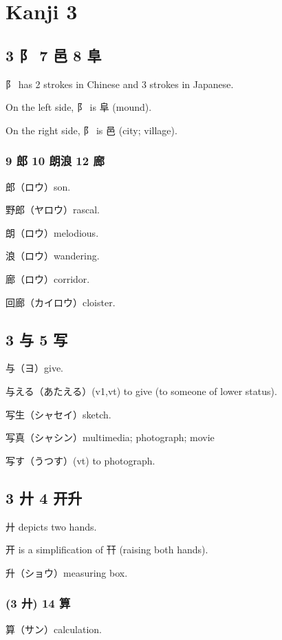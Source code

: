 \chapter{Kanji 3}

\section{3 阝 7 邑 8 阜}

阝 has 2 strokes in Chinese and 3 strokes in Japanese.

On the left side, 阝 is 阜 (mound).

On the right side, 阝 is 邑 (city; village).

\subsection{9 郎 10 朗浪 12 廊}

郎（ロウ）son.

野郎（ヤロウ）rascal.

朗（ロウ）melodious.

浪（ロウ）wandering.

廊（ロウ）corridor.

回廊（カイロウ）cloister.

\section{3 与 5 写}

与（ヨ）give.

与える（あたえる）(v1,vt) to give (to someone of lower status).

写生（シャセイ）sketch.

写真（シャシン）multimedia; photograph; movie

写す（うつす）(vt) to photograph.

\section{3 廾 4 开升}

廾 depicts two hands.

开 is a simplification of 幵 (raising both hands).

升（ショウ）measuring box.

\subsection{(3 廾) 14 算}

算（サン）calculation.

